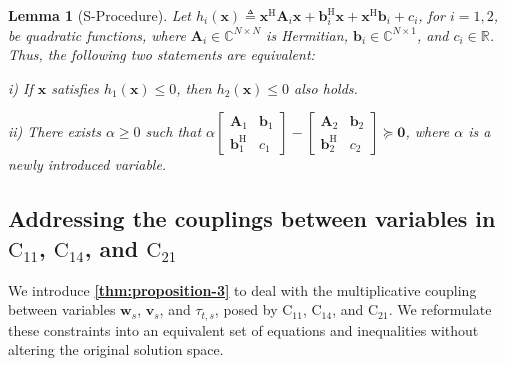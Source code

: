 \documentclass[10pt,journal,compsoc]{IEEEtran}
\newtheorem{lemma}[theorem]{Lemma}
\theoremstyle{myremark}
\theoremstyle{myexample}
\begin{document}
\begin{lemma}[S-Procedure] \label{lem:s-procedure}
	Let $ h_i(\mathbf{x}) \triangleq \mathbf{x}^\mathrm{H} \mathbf{A}_i \mathbf{x} + \mathbf{b}_i^\mathrm{H} \mathbf{x} + \mathbf{x}^\mathrm{H} \mathbf{b}_i + c_i $, for $ i = 1, 2 $, be quadratic functions, where $ \mathbf{A}_i \in \mathbb{C}^{N \times N} $ is Hermitian, $ \mathbf{b}_i \in \mathbb{C}^{N \times 1} $, and $ c_i \in \mathbb{R} $. Thus, the following two statements are equivalent: 
 
 	i) If $ \mathbf{x} $ satisfies  $ h_1(\mathbf{x}) \leq 0 $, then $ h_2(\mathbf{x}) \leq 0 $ also holds.
 
 	ii) There exists $ \alpha \geq 0 $ such that 
 	$ \alpha 	\left[ 
   					\begin{smallmatrix}
   					   	\mathbf{A}_1  	  & \mathbf{b}_1 \\
 	    			\mathbf{b}_1^\mathrm{H}        & c_1
   				  	\end{smallmatrix} 
   			\right]  
   			- 
   			\left[ 
  					\begin{smallmatrix}
 							\mathbf{A}_2   & \mathbf{b}_2 \\
 			    	\mathbf{b}_2^\mathrm{H}         & c_2
 						\end{smallmatrix} 
 			\right]  \succcurlyeq \mathbf{0} 
 	$,
 	where $ \alpha $ is a newly introduced variable.
\end{lemma}






\subsection{Addressing the couplings between variables in $ \mathrm{C}_{11} $, $ \mathrm{C}_{14} $, and $ \mathrm{C}_{21} $}

We introduce \textbf{\cref{thm:proposition-3}} to deal with the multiplicative coupling between variables $ \mathbf{w}_s $, $ \mathbf{v}_s $, and $ \tau_{t,s} $, posed by $ \mathrm{C}_{11} $, $ \mathrm{C}_{14} $, and $ \mathrm{C}_{21} $. We reformulate these constraints into an equivalent set of equations and inequalities without altering the original solution space.
\end{document}
